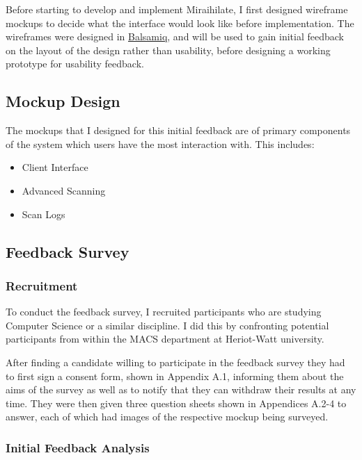 Before starting to develop and implement Miraihilate, I first designed wireframe mockups to decide what the interface would look like before implementation. The wireframes were designed in \href{https://balsamiq.com}{Balsamiq}, and will be used to gain initial feedback on the layout of the design rather than usability, before designing a working prototype for usability feedback.

\subsection{Mockup Design}

The mockups that I designed for this initial feedback are of primary components of the system which users have the most interaction with. This includes:
\begin{itemize}
	\item{Client Interface}
	\item{Advanced Scanning}
	\item{Scan Logs}
\end{itemize}

\subsection{Feedback Survey}

\subsubsection{Recruitment}

To conduct the feedback survey, I recruited participants who are studying Computer Science or a similar discipline. I did this by confronting potential participants from within the MACS department at Heriot-Watt university.

\vspace{0.5cm}

After finding a candidate willing to participate in the feedback survey they had to first sign a consent form, shown in Appendix A.1, informing them about the aims of the survey as well as to notify that they can withdraw their results at any time. They were then given three question sheets shown in Appendices A.2-4 to answer, each of which had images of the respective mockup being surveyed.

\subsubsection{Initial Feedback Analysis}

